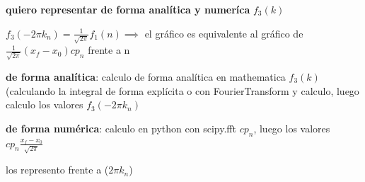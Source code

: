 \documentclass{article}
\begin{document}
\begin{description}
\item \textbf{quiero representar de forma analítica y numeríca} $f_3(k)$
\item $f_3(-2 \pi k_n) =\frac{1}{\sqrt{2 \pi}} f_1(n) \implies $ el gráfico es equivalente al gráfico de $ \frac{1}{\sqrt{2 \pi}} (x_f - x_0) cp_n$ frente a n
\item \textbf{de forma analítica}: calculo de forma analítica en mathematica $f_3(k)$ (calculando la integral de forma explícita o con FourierTransform y calculo, luego calculo los valores $f_3(-2 \pi k_n)$
\item \textbf{de forma numérica}: calculo en python con scipy.fft $cp_n$, luego los valores $cp_n \frac{x_f - x_0}{\sqrt{2 \pi}}$  
\item los represento frente a ($2 \pi k_n$)
\color{black} 
\end{description}
\end{document}
